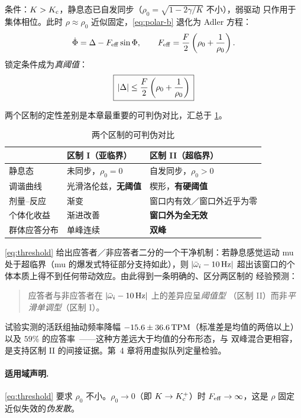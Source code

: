条件：$K>K_{\mathrm{c}}$，静息态已自发同步（$\rho_0=\sqrt{1-2\gamma/K}$ 不小），弱驱动
只作用于集体相位。此时 $\rho\approx\rho_0$ 近似固定，\cref{eq:polar-b}
退化为 Adler 方程：
%
\begin{equation}\label{eq:adlereff}
\dot\Phi=\Delta-F_{\mathrm{eff}}\sin\Phi ,
\qquad
F_{\mathrm{eff}}=\frac{F}{2}\left(\rho_0+\frac{1}{\rho_0}\right).
\end{equation}
%
锁定条件成为\emph{真阈值}：
%
\begin{equation}\label{eq:threshold}
\boxed{\,|\Delta|\le\frac{F}{2}\left(\rho_0+\frac{1}{\rho_0}\right)\,}
\end{equation}

两个区制的定性差别是本章最重要的可判伪对比，汇总于 \cref{tab:regimes}。

\begin{table}[htbp]
\centering
\caption{两个区制的可判伪对比}
\label{tab:regimes}
\small
\begin{tabularx}{\textwidth}{@{}l X X@{}}
\toprule
 & 区制 I（亚临界） & 区制 II（超临界） \\
\midrule
静息态        & 未同步，$\rho_0=0$        & 自发同步，$\rho_0>0$ \\
调谐曲线      & 光滑洛伦兹，\textbf{无阈值} & 楔形，\textbf{有硬阈值} \\
剂量--反应    & 渐变                      & 窗口内有效／窗口外近乎为零 \\
个体化收益    & 渐进改善                  & \textbf{窗口外为全无效} \\
群体应答分布  & 单峰连续                  & \textbf{双峰} \\
\bottomrule
\end{tabularx}
\end{table}

\cref{eq:threshold} 给出应答者／非应答者二分的一个干净机制：若静息感觉运动
mu 处于超临界（mu 的爆发式特征部分支持如此），则 $|\bar{\omega}_i-10\,\mathrm{Hz}|$
超出该窗口的个体本质上得不到任何带动效应。由此得到一条明确的、区分两区制的
经验预测：
%
\begin{quote}
应答者与非应答者在 $|\bar{\omega}_i-10\,\mathrm{Hz}|$ 上的差异应呈\emph{阈值型}
（区制 II）而非\emph{平滑单调型}（区制 I）。
\end{quote}
%
试验实测的活跃组抽动频率降幅 $-15.6\pm36.6\,\mathrm{TPM}$（标准差是均值的两倍以上）
以及 $59\%$ 的应答率~\citep{Maiquez2023}——这种方差远大于均值的分布形态，与
双峰混合更相容，是支持区制 II 的间接证据。第~4 章将用虚拟队列定量检验。

\paragraph{适用域声明.}
\cref{eq:threshold} 要求 $\rho_0$ 不小。$\rho_0\to0$（即 $K\to K_{\mathrm{c}}^{+}$）时
$F_{\mathrm{eff}}\to\infty$，这是 $\rho$ 固定近似失效的\emph{伪发散}。

